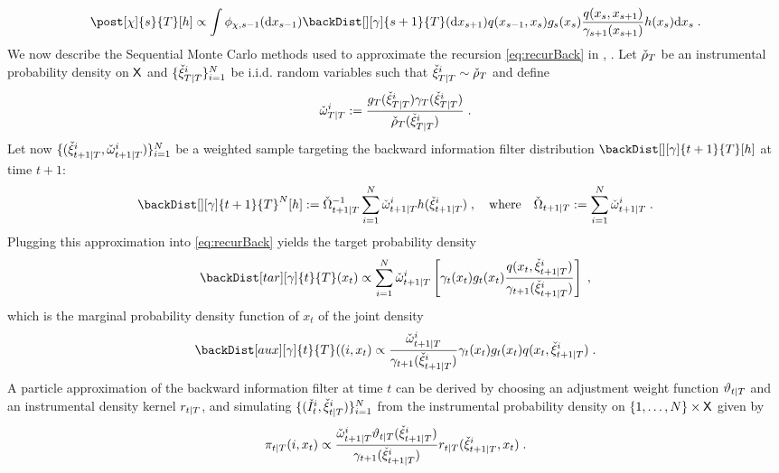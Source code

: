 \begin{equation}
\label{eq:filtBackfilt}
\post[\Xinit]{s}{T}[h]  \propto \int \filt{\Xinit,s-1}(\rmd x_{s-1}) \backDist[][\gamma]{s+1}{T}(\rmd x_{s+1})q(x_{s-1},x_s) g_s(x_s) \frac{q(x_s,x_{s+1})}{\gamma_{s+1}(x_{s+1})} h(x_s) \rmd x_s \eqsp.
\end{equation}
 We now describe the Sequential Monte Carlo methods used to approximate the recursion \eqref{eq:recurBack} in \cite{briers:doucet:maskell:2010}, \cite{fearnhead:wyncoll:tawn:2010}.
Let ${\check{\rho}}_T$ be an instrumental probability density on $\mathsf{X}$ and $\{{\check{\xi}}_{T|T}^{i}\}_{i=1}^N$ be i.i.d. random variables such that ${\check{\xi}}_{T|T}^{i}\sim{\check{\rho}}_T$ and define
\[
{\check{\omega}}_{T|T}^{i} := \frac{g_T({\check{\xi}}_{T|T}^{i})\gamma_T({\check{\xi}}_{T|T}^{i})}{{\check{\rho}}_T({\check{\xi}}_{T|T}^{i})}\;.
\]
Let now $\{ ({\check{\xi}}_{t+1|T}^{i},{\check{\omega}}_{t+1|T}^{i}) \}_{i=1}^N$ be a weighted sample targeting the backward information filter distribution $\backDist[][\gamma]{t+1}{T}[h]$  at time $t+1$:
\[
\backDist[][\gamma]{t+1}{T}^N[h] \eqdef \backsumwght{t+1}{T}^{-1} \sum_{i=1}^N \ebackwght{t+1}{T}{i}h(\ebackpart{t+1}{T}{i})\eqsp,\quad\mbox{where}\quad\backsumwght{t+1}{T} \eqdef \sum_{i=1}^N \ebackwght{t+1}{T}{i}\eqsp.
\]
Plugging this approximation into \eqref{eq:recurBack} yields the target probability density
\begin{equation*}
\backDist[tar][\gamma]{t}{T}(x_t)\propto \sum_{i=1}^N \ebackwght{t+1}{T}{i} \left[\gamma_t(x_t) g_t(x_t) \frac{q(x_t,\ebackpart{t+1}{T}{i})}{\gamma_{t+1}(\ebackpart{t+1}{T}{i})} \right] \eqsp,
\end{equation*}
which is the marginal probability density function of  $x_t$ of the joint  density
\begin{equation*}
\backDist[aux][\gamma]{t}{T} ((i, x_t) \propto \frac{\ebackwght{t+1}{T}{i}}{\gamma_{t+1}(\ebackpart{t+1}{T}{i})} \gamma_t(x_t) g_t(x_t) q(x_t, \ebackpart{t+1}{T}{i}) \eqsp.
\end{equation*}
A particle approximation of the backward information filter at time $t$ can be derived by choosing an adjustment weight function $\adjfunc{t}{T}{}$ and an instrumental density kernel $\kiss{t}{T}$, and simulating $\{ (\check{I}^i_t, {\check{\xi}}_{t|T}^{i}) \}_{i=1}^N$ from
the instrumental probability density on $\{1,\ldots,N\}\times\mathsf{X}$ given by
\begin{equation}
\label{eq:ebackparticle-update-backward-filtering}
\instrpostaux{t}{T}(i,x_t)\propto  \frac{\ebackwght{t+1}{T}{i} \adjfunc{t}{T}{\ebackpart{t+1}{T}{i}}}{\gamma_{t+1}(\ebackpart{t+1}{T}{i})} \kiss{t}{T}(\ebackpart{t+1}{T}{i},x_t) \eqsp.
\end{equation}
